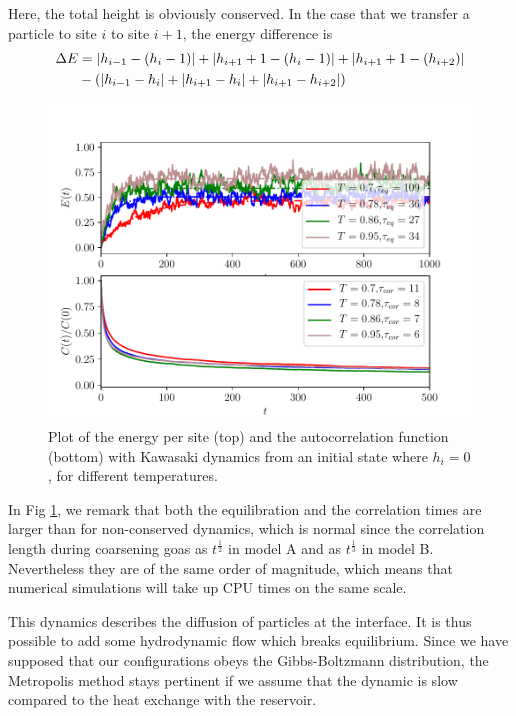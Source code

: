 Here, the total height is obviously conserved. In the case that we transfer a particle to site $i$ to site $i+1$, the energy difference is
\begin{align}
\Delta E &= |h_{i-1}-(h_i - 1)| + |h_{i+1} + 1 -(h_i- 1)| + |h_{i+1} + 1-(h_{i+2} )| \nonumber \\
& - \left( |h_{i-1}-h_i| + |h_{i+1} -h_i| + |h_{i+1}-h_{i+2}| \right)
\end{align}

\begin{figure}[t]
\centering
\includegraphics[scale=1]{numerical/sos-kaw-eq-cor.pdf}
\caption{Plot of the energy per site (top) and the autocorrelation function (bottom) with Kawasaki dynamics from an initial state where $h_i=0$, for different temperatures.}
\label{eq-kaw}
\end{figure}
In Fig \ref{eq-kaw}, we remark that both the equilibration and the correlation times are larger than for non-conserved dynamics, which is normal since the correlation length during coarsening goas as $t^\frac{1}{2}$ in model A and as $t^\frac{1}{3}$ in model B. Nevertheless they are of the same order of magnitude, which means that numerical simulations will take up CPU times on the same scale.

This dynamics describes the diffusion of particles at the interface. It is thus possible to add some hydrodynamic flow which breaks equilibrium. Since we have supposed that our configurations obeys the Gibbs-Boltzmann distribution, the Metropolis method stays pertinent if we assume that the dynamic is slow compared to the heat exchange with the reservoir.

